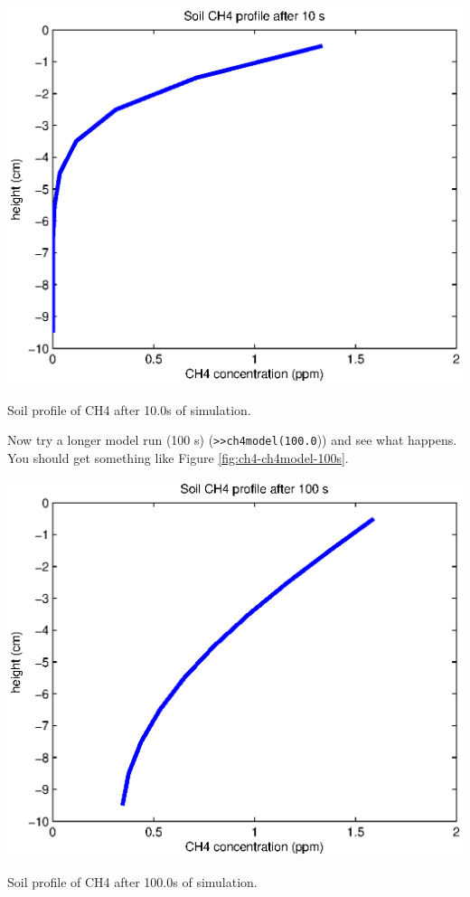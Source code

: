 \documentclass{tufte-book} %
\begin{document}
\begin{marginfigure}[-4.0in]
\includegraphics[width=\linewidth]{ch4-ch4model-10s.eps}
\caption{Soil profile of CH4 after 10.0s of simulation.}
\label{fig:ch4-ch4model-10s}
\end{marginfigure}

Now try a longer model run (100 s) (\texttt{>>ch4model(100.0})) and see what happens. You should get something like Figure \ref{fig:ch4-ch4model-100s}.

\begin{marginfigure}[-1.0in]
\includegraphics[width=\linewidth]{ch4-ch4model-100s.eps}
\caption{Soil profile of CH4 after 100.0s of simulation.}
\label{fig:ch4-ch4model-100s}
\end{marginfigure}
\end{document}
